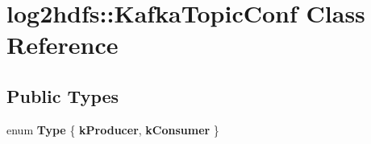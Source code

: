 \hypertarget{classlog2hdfs_1_1KafkaTopicConf}{}\section{log2hdfs\+:\+:Kafka\+Topic\+Conf Class Reference}
\label{classlog2hdfs_1_1KafkaTopicConf}
\subsection*{Public Types}
\begin{DoxyCompactItemize}
\item 
enum {\bfseries Type} \{ {\bfseries k\+Producer}, 
{\bfseries k\+Consumer}
 \}\hypertarget{classlog2hdfs_1_1KafkaTopicConf_a0af6a61bea8b44482f5d386a419fa135}{}\label{classlog2hdfs_1_1KafkaTopicConf_a0af6a61bea8b44482f5d386a419fa135}

\end{DoxyCompactItemize}
